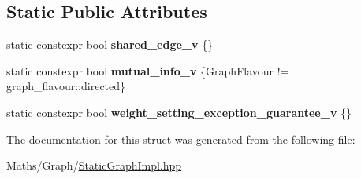 \subsection*{Static Public Attributes}
\begin{DoxyCompactItemize}
\item 
\mbox{\label{structsequoia_1_1maths_1_1graph__impl_1_1static__edge__traits_a88d70911974945bde9bbcb84f664cf64}} 
static constexpr bool {\bfseries shared\+\_\+edge\+\_\+v} \{\}
\item 
\mbox{\label{structsequoia_1_1maths_1_1graph__impl_1_1static__edge__traits_a44f2b2283e917504f62e15a419444a1d}} 
static constexpr bool {\bfseries mutual\+\_\+info\+\_\+v} \{Graph\+Flavour != graph\+\_\+flavour\+::directed\}
\item 
\mbox{\label{structsequoia_1_1maths_1_1graph__impl_1_1static__edge__traits_ae35432254a0449bc2d8e3f31f77f2e26}} 
static constexpr bool {\bfseries weight\+\_\+setting\+\_\+exception\+\_\+guarantee\+\_\+v} \{\}
\end{DoxyCompactItemize}


The documentation for this struct was generated from the following file\+:\begin{DoxyCompactItemize}
\item 
Maths/\+Graph/\mbox{\hyperlink{_static_graph_impl_8hpp}{Static\+Graph\+Impl.\+hpp}}\end{DoxyCompactItemize}
